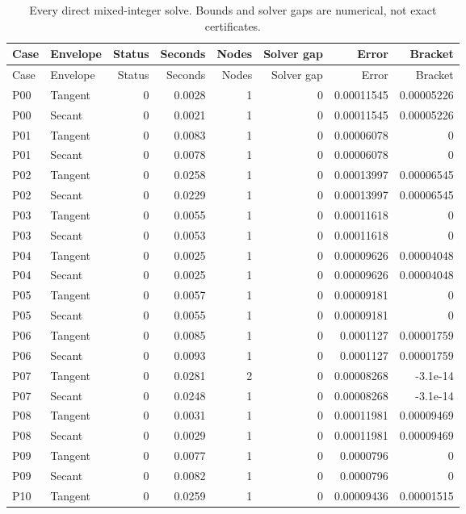\begin{longtable}{llrrrrrr}
\caption{Every direct mixed-integer solve. Bounds and solver gaps are numerical, not exact certificates.}\label{tab:r49-mip}\\
\toprule
Case & Envelope & Status & Seconds & Nodes & Solver gap & Error & Bracket \\
\midrule\endfirsthead
\toprule
Case & Envelope & Status & Seconds & Nodes & Solver gap & Error & Bracket \\
\midrule\endhead
P00 & Tangent & 0 & 0.0028 & 1 & 0 & 0.00011545 & 0.00005226 \\
P00 & Secant & 0 & 0.0021 & 1 & 0 & 0.00011545 & 0.00005226 \\
P01 & Tangent & 0 & 0.0083 & 1 & 0 & 0.00006078 & 0 \\
P01 & Secant & 0 & 0.0078 & 1 & 0 & 0.00006078 & 0 \\
P02 & Tangent & 0 & 0.0258 & 1 & 0 & 0.00013997 & 0.00006545 \\
P02 & Secant & 0 & 0.0229 & 1 & 0 & 0.00013997 & 0.00006545 \\
P03 & Tangent & 0 & 0.0055 & 1 & 0 & 0.00011618 & 0 \\
P03 & Secant & 0 & 0.0053 & 1 & 0 & 0.00011618 & 0 \\
P04 & Tangent & 0 & 0.0025 & 1 & 0 & 0.00009626 & 0.00004048 \\
P04 & Secant & 0 & 0.0025 & 1 & 0 & 0.00009626 & 0.00004048 \\
P05 & Tangent & 0 & 0.0057 & 1 & 0 & 0.00009181 & 0 \\
P05 & Secant & 0 & 0.0055 & 1 & 0 & 0.00009181 & 0 \\
P06 & Tangent & 0 & 0.0085 & 1 & 0 & 0.0001127 & 0.00001759 \\
P06 & Secant & 0 & 0.0093 & 1 & 0 & 0.0001127 & 0.00001759 \\
P07 & Tangent & 0 & 0.0281 & 2 & 0 & 0.00008268 & -3.1e-14 \\
P07 & Secant & 0 & 0.0248 & 1 & 0 & 0.00008268 & -3.1e-14 \\
P08 & Tangent & 0 & 0.0031 & 1 & 0 & 0.00011981 & 0.00009469 \\
P08 & Secant & 0 & 0.0029 & 1 & 0 & 0.00011981 & 0.00009469 \\
P09 & Tangent & 0 & 0.0077 & 1 & 0 & 0.0000796 & 0 \\
P09 & Secant & 0 & 0.0082 & 1 & 0 & 0.0000796 & 0 \\
P10 & Tangent & 0 & 0.0259 & 1 & 0 & 0.00009436 & 0.00001515 \\

\end{longtable}
